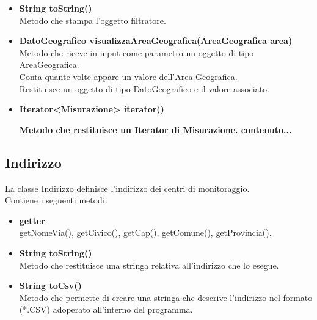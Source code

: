 \documentclass[a4paper, 12pt]{scrreprt}
\begin{document}
\begin{itemize}
				\item \textbf {String toString()}
				\\Metodo che stampa l'oggetto filtratore.
				
				\item \textbf{DatoGeografico visualizzaAreaGeografica(AreaGeografica area)}
				\\Metodo che riceve in input come parametro un oggetto di tipo AreaGeografica.
				\\Conta quante volte appare un valore dell'Area Geografica.
				\\Restituisce un oggetto di tipo DatoGeografico e il valore associato.
				
				\item \textbf{Iterator<Misurazione> iterator()}
				
				
				
				\textbf{Metodo che restituisce un Iterator di Misurazione.	contenuto...}
				
				
				
			\end{itemize}
			\subsection{Indirizzo}
			La classe Indirizzo definisce l'indirizzo dei centri di monitoraggio.
			\\Contiene i seguenti metodi:\\
			\begin{itemize}
				\item \textbf{getter}
				\\ getNomeVia(), getCivico(), getCap(), getComune(), getProvincia().
				
				\item \textbf{String toString()}
				\\Metodo che restituisce una stringa relativa all'indirizzo che lo esegue.
				
				\item \textbf{String toCsv()}
				\\Metodo che permette di creare una stringa che descrive l'indirizzo nel formato (*.CSV) adoperato all'interno del programma.
			\end{itemize}
\end{document}
